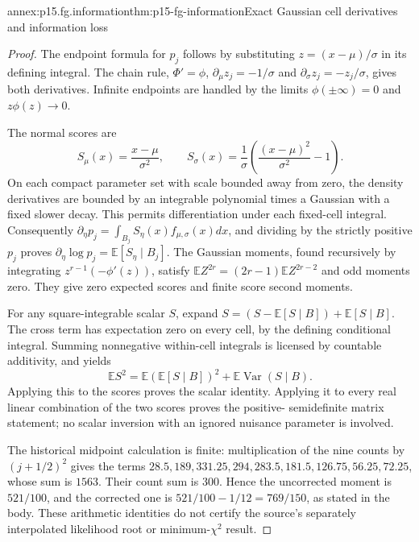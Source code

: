 \begin{annexitem}{annex:p15.fg.information}{thm:p15-fg-information}{Exact Gaussian cell derivatives and information loss}
\begin{proof}
The endpoint formula for \(p_j\) follows by substituting
\(z=(x-\mu)/\sigma\) in its defining integral. The chain rule,
\(\Phi'=\phi\), \(\partial_\mu z_j=-1/\sigma\) and
\(\partial_\sigma z_j=-z_j/\sigma\), gives both derivatives.
Infinite endpoints are handled by the limits \(\phi(\pm\infty)=0\)
and \(z\phi(z)\to0\).

The normal scores are
\[
 S_\mu(x)=\frac{x-\mu}{\sigma^2},\qquad
 S_\sigma(x)=\frac1\sigma\left(\frac{(x-\mu)^2}{\sigma^2}-1\right).
\]
On each compact parameter set with scale bounded away from zero,
the density derivatives are bounded by an integrable polynomial times
a Gaussian with a fixed slower decay. This permits differentiation under
each fixed-cell integral. Consequently
\(\partial_\eta p_j=\int_{B_j}S_\eta(x)f_{\mu,\sigma}(x)dx\),
and dividing by the strictly positive \(p_j\) proves
\(\partial_\eta\log p_j=\mathbb E[S_\eta\mid B_j]\).
The Gaussian moments, found recursively by integrating
\(z^{r-1}(-\phi'(z))\), satisfy
\(\mathbb EZ^{2r}=(2r-1)\mathbb EZ^{2r-2}\) and odd moments zero.
They give zero expected scores and finite score second moments.

For any square-integrable scalar \(S\), expand
\(S=(S-\mathbb E[S\mid B])+\mathbb E[S\mid B]\).
The cross term has expectation zero on every cell, by the defining
conditional integral. Summing nonnegative within-cell integrals is
licensed by countable additivity, and yields
\[
 \mathbb ES^2=\mathbb E(\mathbb E[S\mid B])^2
                   +\mathbb E\operatorname{Var}(S\mid B).
\]
Applying this to the scores proves the scalar identity. Applying it to
every real linear combination of the two scores proves the positive-
semidefinite matrix statement; no scalar inversion with an ignored
nuisance parameter is involved.

The historical midpoint calculation is finite: multiplication of the
nine counts by \((j+1/2)^2\) gives the terms
\(28.5,189,331.25,294,283.5,181.5,126.75,56.25,72.25\), whose sum
is \(1563\). Their count sum is \(300\). Hence the uncorrected
moment is \(521/100\), and the corrected one is
\(521/100-1/12=769/150\), as stated in the body. These arithmetic
identities do not certify the source's separately interpolated likelihood
root or minimum-\(\chi^2\) result.
\end{proof}
\end{annexitem}

